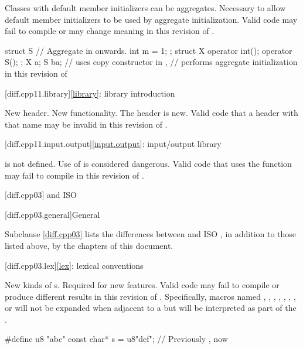 \change
Classes with default member initializers can be aggregates.
\rationale
Necessary to allow default member initializers to be used
by aggregate initialization.
\effect
Valid \CppXI{} code may fail to compile or may change meaning in this revision of \Cpp{}.
\begin{example}
\begin{codeblock}
struct S {          // Aggregate in \CppXIV{} onwards.
  int m = 1;
};
struct X {
  operator int();
  operator S();
};
X a{};
S b{a};             // uses copy constructor in \CppXI{},
                    // performs aggregate initialization in this revision of \Cpp{}
\end{codeblock}
\end{example}

[diff.cpp11.library]{\ref*{library}: library introduction}

\change
New header.
\rationale
New functionality.
\effect
The \Cpp{} header  is new.
Valid \CppXI{} code that  a header with that name may be
invalid in this revision of \Cpp{}.

[diff.cpp11.input.output]{\ref*{input.output}: input/output library}

\change
{} is not defined.
\rationale
Use of  is considered dangerous.
\effect
Valid \CppXI{} code that uses the  function may fail to compile
in this revision of \Cpp{}.

[diff.cpp03]{\Cpp{} and ISO \CppIII{}}

[diff.cpp03.general]{General}

\pnum
{}%
Subclause \ref{diff.cpp03} lists the differences between \Cpp{} and
ISO \CppIII{},
in addition to those listed above,
by the chapters of this document.

[diff.cpp03.lex]{\ref*{lex}: lexical conventions}

\change
New kinds of s.
\rationale
Required for new features.
\effect
Valid \CppIII{} code may fail to compile or produce different results in
this revision of \Cpp{}. Specifically, macros named , ,
, , , , , or  will
not be expanded when adjacent to a  but will be interpreted as
part of the .
\begin{example}
\begin{codeblock}
#define u8 "abc"
const char* s = u8"def";        // Previously , now 
\end{codeblock}
\end{example}

